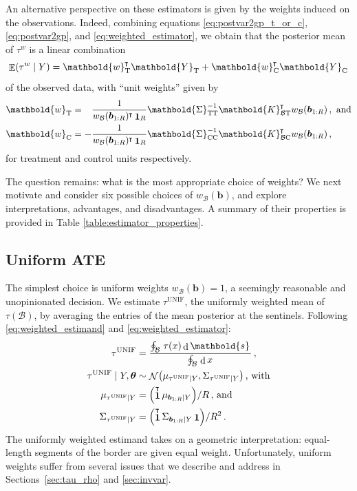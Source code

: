 \documentclass[letter,12pt]{article}
\DeclarePairedDelimiter{\parenthesis}{\lparen}{\rparen}
\newcommand{\del}[1]{\parenthesis*{#1}}
\DeclareMathOperator{\dif}{d}
\DeclareMathOperator{\E}{\mathbb{E}}
\DeclareMathOperator{\normal}{\mathcal{N}}
\DeclareMathOperator{\ones}{\mathbf{1}}
\newcommand*{\trans}{^{\mkern-1.5mu\intercal}}
\newcommand{\treat}{\mathrm{T}}
\newcommand{\ctrol}{\mathrm{C}}
\newcommand{\svec}{\mathbold{s}}
\newcommand{\wvec}{\mathbold{w}}
\newcommand{\Yvec}{\mathbold{Y}}
\newcommand{\yt}{\Yvec_{\treat}}
\newcommand{\yc}{\Yvec_{\ctrol}}
\newcommand{\border}{\mathcal{B}}
\newcommand{\sentinel}{\bm{b}}
\newcommand{\numsent}{R}
\newcommand{\sentinels}{\sentinel_{1:\numsent}}
\newcommand{\tauw}{\tau^{w}}
\newcommand{\unifavg}{\tau^{\mathrm{UNIF}}}
\newcommand{\eqlabel}[1]{\label{#1}}
\newcommand{\hyperparam}{\bm{\theta}}
\newcommand{\weightb}{w_{\border}}
\newcommand{\wt}{\wvec_{\treat}}
\newcommand{\wc}{\wvec_{\ctrol}}
\newcommand{\Kmat}{\mathbold{K}}
\newcommand{\SigmaMat}{\mathbold{\Sigma}}
\newcommand{\KBT}{\Kmat_{\border \treat}}
\newcommand{\KBC}{\Kmat_{\border \ctrol}}
\newcommand{\STT}{\SigmaMat_{\treat \treat}}
\newcommand{\SCC}{\SigmaMat_{\ctrol \ctrol}}
\begin{document}
An alternative perspective on these estimators is given by the weights induced on the observations.
Indeed, combining equations \eqref{eq:postvar2gp_t_or_c}, \eqref{eq:postvar2gp}, and \eqref{eq:weighted_estimator}, we obtain that the posterior mean of \(\tauw\) is a linear combination
\begin{equation}
    \E\del{\tauw \mid Y} = \wt\trans \yt + \wc\trans \yc
    \eqlabel{eq:unit_weights}
\end{equation}
of the observed data, with ``unit weights'' given by
\begin{equation}
    \begin{split}
        \wt &= \hphantom{-} \frac{1}{\weightb(\sentinels)\trans \ones_{\numsent}}
        \STT^{-1} 
        \KBT\trans \weightb(\sentinels) \,, 
        \text{ and}
        \\
        \wc &= -\frac{1}{\weightb(\sentinels)\trans \ones_{\numsent}} 
        \SCC^{-1} 
        \KBC\trans \weightb(\sentinels) \,,
    \end{split}
    \eqlabel{eq:unit_weights_gp}
\end{equation}
for treatment and control units respectively.

The question remains: what is the most appropriate choice of weights? We next motivate and consider six possible choices of \(\weightb(\sentinel)\), and explore interpretations, advantages, and disadvantages. A summary of their properties is provided in Table \ref{table:estimator_properties}.



\hypertarget{uniform-ate}{%
\subsection{Uniform ATE}\label{uniform-ate}}

The simplest choice is uniform weights \(\weightb(\sentinel)=1\), a seemingly reasonable and unopinionated decision.
We estimate \(\unifavg\), the uniformly weighted mean of \(\tau(\border)\), by averaging the entries of the mean posterior at the sentinels.
Following \eqref{eq:weighted_estimand} and \eqref{eq:weighted_estimator}:
\begin{equation}\begin{split}
    \unifavg &= \frac{\oint_\border \left. \tau(x) \dif \svec \right.}
    {\oint_\border \left. \dif x \right.}\,, \\
    \unifavg \mid Y, \hyperparam &\sim \normal\del{\mu_{\unifavg \mid Y}, \Sigma_{\unifavg \mid Y}}\,\text{, with} \\
    \mu_{\unifavg \mid Y} &= \del{\ones\trans \mu_{\sentinels \mid Y}} / \numsent\,\text{, and} \\
    \Sigma_{\unifavg \mid Y} &= \del{\ones\trans \Sigma_{\sentinels \mid Y} \ones} / \numsent^2 \,.
\end{split}
\eqlabel{eq:unifavg}
\end{equation}
The uniformly weighted estimand takes on a geometric interpretation: equal-length segments of the border are given equal weight.
Unfortunately, uniform weights suffer from several issues that we describe and address in Sections~\ref{sec:tau_rho} and \ref{sec:invvar}.
\end{document}
